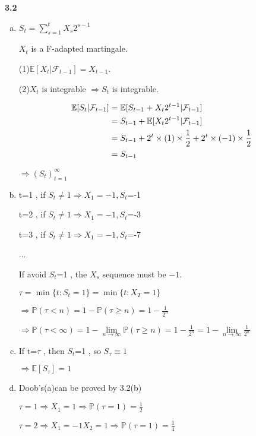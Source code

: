 \noindent\textbf{3.2}
\begin{enumerate}[(a)]
    \item $S_t=\sum^t_{s=1}X_s2^{s-1}$
    
    $X_t$ is a F-adapted martingale.
    
    (1)$\mathbb{E}[X_t|\mathcal{F}_{t-1}]=X_{t-1}$.
    
    (2)$X_t$ is integrable $\Rightarrow S_t$ is integrable. 
    
    \begin{align}
    \mathbb{E}[S_t|\mathcal{F}_{t-1}] &=\mathbb{E}[S_{t-1}+X_t2^{t-1}|\mathcal{F}_{t-1}]\notag\\
    &=S_{t-1}+\mathbb{E}[X_t2^{t-1}|\mathcal{F}_{t-1}]\notag\\
    &=S_{t-1}+2^t\times(1)\times\frac{1}{2}+2^t\times(-1)\times\frac{1}{2}\notag\\
    &=S_{t-1}\notag
    \end{align}
    
    $\Rightarrow (S_t)^\infty_{t=1}$
    
    \item t=1 , if $S_t\not=1 \Rightarrow X_1=-1 , S_t$=-1
    
    t=2 , if $S_t\not=1 \Rightarrow X_1=-1 , S_t$=-3
    
    t=3 , if $S_t\not=1 \Rightarrow X_1=-1 , S_t$=-7
    
    ...
    
    If avoid $S_t$=1 , the $X_s$ sequence must be $-1$.
    
    $\tau=\min\{t:S_t=1\}=\min\{t:X_T=1\}$
    
    $\Rightarrow \mathbb{P}(\tau<n) = 1-\mathbb{P}(\tau\ge n) = 1-\frac{1}{2^n}$
    
    $\Rightarrow \mathbb{P}(\tau < \infty) = 1-\lim\limits_{n \to \infty} \mathbb{P}(\tau\ge n) = 1-\frac{1}{2^n} = 1-\lim\limits_{n \to \infty}\frac{1}{2^n}$ 
    
    \item If t=$\tau$ , then $S_t$=1 , so $S_\tau\equiv1$
    
    $\Rightarrow \mathbb{E}[S_\tau]=1$
    
    \item Doob's(a)can be proved by 3.2(b)
    
    $\tau=1 \Rightarrow X_1=1 \Rightarrow \mathbb{P}(\tau=1)=\frac{1}{2}$
    
    $\tau=2 \Rightarrow X_1=-1 X_2=1 \Rightarrow \mathbb{P}(\tau=1)=\frac{1}{4}$
    

\end{enumerate}
